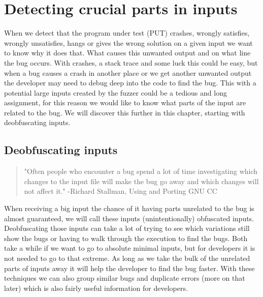 \chapter{Detecting crucial parts in inputs}
\label{inputReduction:intro}
When we detect that the program under test (PUT) crashes, wrongly satisfies, wrongly unsatisfies, hangs or gives the wrong solution on a given input we want to know why it does that. What causes this unwanted output and on what line the bug occurs. With crashes, a stack trace and some luck this could be easy, but when a bug causes a crash in another place or we get another unwanted output the developer may need to debug deep into the code to find the bug. This with a potential large inputs created by the fuzzer could be a tedious and long assignment, for this reason we would like to know what parts of the input are related to the bug. We will discover this further in this chapter, starting with deobfuscating inputs.

\section{Deobfuscating inputs}
\label{inputReduction:Deobfuscating}
\begin{quote}
	"Often people who encounter a bug spend a lot of time investigating which changes to the input file will make the bug go away and which changes will not affect it." \cite{50akgun2018metamorphic}
	\newline
	-Richard Stallman,	Using and Porting GNU CC
\end{quote} 
When receiving a big input the chance of it having parts unrelated to the bug is almost guaranteed, we will call these inputs (unintentionally) obfuscated inputs. Deobfuscating those inputs can take a lot of trying to see which variations still show the bugs or having to walk through the execution to find the bugs. Both take a while if we want to go to absolute minimal inputs, but for developers it is not needed to go to that extreme. As long as we take the bulk of the unrelated parts of inputs away it will help the developer to find the bug faster. With these techniques we can also group similar bugs and duplicate errors (more on that later) which is also fairly useful information for developers.

